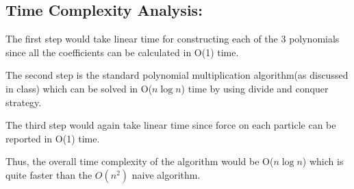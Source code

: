 \documentclass{article}
\begin{document}
\subsection{Time Complexity Analysis:}
\par
The first step would take linear time for constructing each of the 3 polynomials since all the coefficients can be calculated in O(1) time.
\par
The second step is the standard polynomial multiplication algorithm(as discussed in class) which can be solved in O($n\log n$) time by using divide and conquer strategy.
\par
The third step would again take linear time since force on each particle can be reported in O(1) time.
\par
Thus, the overall time complexity of the algorithm would be O($n\log n$) which is quite faster than the $O(n^2)$ naive algorithm.
\end{document}
